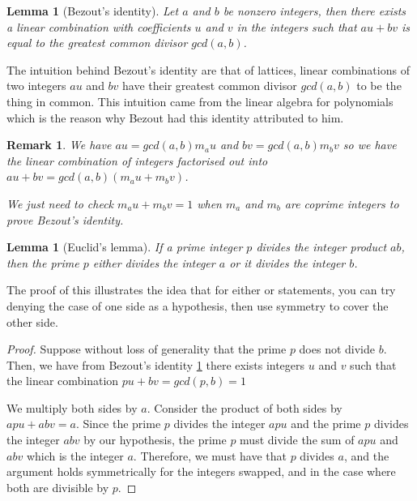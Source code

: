 \documentclass{tufte-book}
\newtheorem{lemma}[theorem]{Lemma}
\newtheorem{remark}[theorem]{Remark}
\begin{document}
\begin{lemma}[Bezout's identity]\label{lem:bezout-identity}
  Let $a$ and $b$ be nonzero integers, then there exists a linear combination with coefficients $u$ and $v$ in the integers such that $au + bv$ is equal to the greatest common divisor $gcd(a,b)$.
\end{lemma}

The intuition behind Bezout's identity are that of lattices, linear combinations of two integers $au$ and $bv$ have their greatest common divisor $gcd(a,b)$ to be the thing in common. This intuition came from the linear algebra for polynomials which is the reason why Bezout had this identity attributed to him.

\begin{remark}
	We have $a u = gcd(a,b) m_a u$ and $b v = gcd(a,b) m_b v$ so we have the linear combination of integers factorised out into $au + bv = gcd(a,b)(m_a u + m_b v)$. 
	
	We just need to check $m_a u + m_b v = 1$ when $m_a$ and $m_b$ are coprime integers to prove Bezout's identity.
\end{remark}

\begin{lemma}[Euclid's lemma]
	If a prime integer $p$ divides the integer product $ab$, then the prime $p$ either divides the integer $a$ or it divides the integer $b$.
\end{lemma}

The proof of this illustrates the idea that for either or statements, you can try denying the case of one side as a hypothesis, then use symmetry to cover the other side.

\begin{proof}
	Suppose without loss of generality that the prime $p$ does not divide $b$. Then, we have 
	from Bezout's identity \ref{lem:bezout-identity} there exists integers $u$ and $v$ such that the linear combination $pu + bv = gcd(p,b) = 1$
	
	We multiply both sides by $a$.
	Consider the product of both sides by $apu + abv = a$. Since the prime $p$ divides the integer $apu$ and the prime $p$ divides the integer $abv$ by our hypothesis, the prime $p$ must divide the sum of $apu$ and $abv$ which is the integer $a$. Therefore, we must have that $p$ divides $a$, and the argument holds symmetrically for the integers swapped, and in the case where both are divisible by $p$.
\end{proof}
\end{document}
